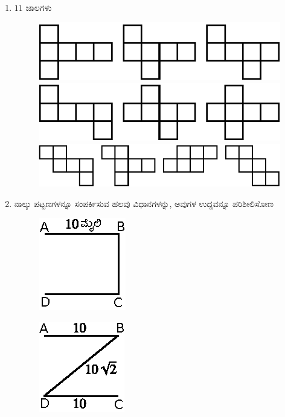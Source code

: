 \begin{enumerate}
\item $11$ ಜಾಲಗಳು 
\begin{figure}[H]
\centering
\includegraphics[scale =1.3]{images/chap3/ans22a.eps}

\medskip
\includegraphics[scale =1.3]{images/chap3/ans22b.eps}

\medskip
\includegraphics[scale =1.2]{images/chap3/ans22c.eps}
\end{figure}

\eject

\item ನಾಲ್ಕು ಪಟ್ಟಣಗಳನ್ನೂ ಸಂಪರ್ಕಿಸುವ ಹಲವು ವಿಧಾನಗಳನ್ನು, ಅವುಗಳ ಉದ್ದವನ್ನೂ ಪರಿಶೀಲಿಸೋಣ

\begin{minipage}[c]{4.5cm}
\begin{figure}[H]
\centering
\includegraphics{images/chap3/ans23a.eps}
{\fontsize{9pt}{11pt}\selectfont{}}\relax
\end{figure}
\end{minipage}
\begin{minipage}[c]{4.5cm}
\begin{figure}[H]
\centering
\includegraphics{images/chap3/ans23b.eps}


\end{figure}
\end{minipage}
\end{enumerate}

